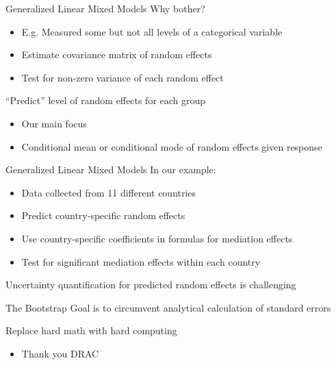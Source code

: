 \documentclass[14pt]{beamer}
\newcommand{\GLMMs}{Generalized Linear Mixed Models}
\begin{document}
\begin{frame}{\GLMMs}
    Why bother?
    \begin{itemize}
        \item E.g. Measured some but not all levels of a categorical variable
        \item Estimate covariance matrix of random effects
        \item Test for non-zero variance of each random effect \newline
    \end{itemize}

    ``Predict'' level of random effects for each group
    \begin{itemize}
        \item Our main focus
        \item Conditional mean or conditional mode of random effects given response
    \end{itemize}
\end{frame}

\begin{frame}{\GLMMs}
    In our example:
    \begin{itemize}
        \item Data collected from 11 different countries
        \item Predict country-specific random effects
        \item Use country-specific coefficients in formulas for mediation effects
        \item Test for significant mediation effects within each country \newline
    \end{itemize}

    Uncertainty quantification for predicted random effects is challenging
\end{frame}

\begin{frame}{The Bootstrap}
    Goal is to circumvent analytical calculation of standard errors \newline

    Replace hard math with hard computing
    \begin{itemize}
        \item Thank you DRAC
    \end{itemize}

    
\end{frame}
\end{document}

